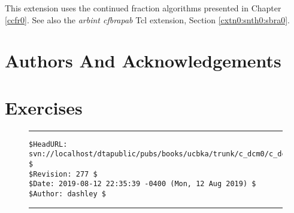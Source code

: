 \begin{dosutilcommandseealso}
This extension uses the continued fraction
algorithms presented in Chapter \ccfrzeroxrefhyphen{}\ref{ccfr0}.
See also the \emph{arbint cfbrapab} Tcl extension, 
Section \cxtnzeroxrefhyphen{}\ref{cxtn0:snth0:sbra0}.
\end{dosutilcommandseealso}


\section{Authors And Acknowledgements}


\section{Exercises}




\noindent\begin{figure}[!b]
\noindent\rule[-0.25in]{\textwidth}{1pt}
\begin{tiny}
\begin{verbatim}
$HeadURL: svn://localhost/dtapublic/pubs/books/ucbka/trunk/c_dcm0/c_dcm0.tex $
$Revision: 277 $
$Date: 2019-08-12 22:35:39 -0400 (Mon, 12 Aug 2019) $
$Author: dashley $
\end{verbatim}
\end{tiny}
\noindent\rule[0.25in]{\textwidth}{1pt}
\end{figure}

%
